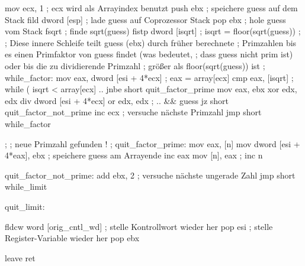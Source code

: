 \begin{AsmCodeListing}[label=prime2.asm, numbers=left, commandchars=\\\{\}]
         mov     ecx, 1              ; ecx wird als Arrayindex benutzt
         push    ebx                 ; speichere guess auf dem Stack
         fild    dword [esp]         ; lade guess auf Coprozessor Stack
         pop     ebx                 ; hole guess vom Stack
         fsqrt                       ; finde sqrt(guess)
         fistp   dword [isqrt]       ; isqrt = floor(sqrt(guess))
 ;
 ; Diese innere Schleife teilt guess (ebx) durch fr\"{u}her berechnete
 ; Primzahlen bis es einen Primfaktor von guess findet (was bedeutet,
 ; dass guess nicht prim ist) oder bis die zu dividierende Primzahl
 ; gr\"{o}{\ss}er als floor(sqrt(guess)) ist
 ;
 while_factor:
         mov     eax, dword [esi + 4*ecx] ; eax = array[ecx]
         cmp     eax, [isqrt]        ; while ( isqrt < array[ecx] ..
         jnbe    short quit_factor_prime
         mov     eax, ebx
         xor     edx, edx
         div     dword [esi + 4*ecx]
         or      edx, edx            ; .. && guess %
         jz      short quit_factor_not_prime
         inc     ecx                 ; versuche n\"{a}chste Primzahl
         jmp     short while_factor

 ;
 ; neue Primzahl gefunden !
 ;
 quit_factor_prime:
         mov     eax, [n]
         mov     dword [esi + 4*eax], ebx ; speichere guess am Arrayende
         inc     eax
         mov     [n], eax            ; inc n

 quit_factor_not_prime:
         add     ebx, 2              ; versuche n\"{a}chste ungerade Zahl
         jmp     short while_limit

 quit_limit:

         fldcw   word [orig_cntl_wd] ; stelle Kontrollwort wieder her
         pop     esi                 ; stelle Register-Variable wieder her
         pop     ebx

         leave
         ret
\end{AsmCodeListing}
  
